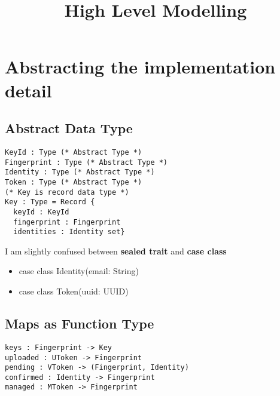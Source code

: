 \documentclass{article}
\begin{document}
\title{High Level Modelling}
\maketitle


\section{Abstracting the implementation detail}

\subsection{Abstract Data Type}
\begin{verbatim}
KeyId : Type (* Abstract Type *)
Fingerprint : Type (* Abstract Type *)
Identity : Type (* Abstract Type *)
Token : Type (* Abstract Type *)
(* Key is record data type *)
Key : Type = Record {
  keyId : KeyId
  fingerprint : Fingerprint
  identities : Identity set} 

\end{verbatim}

I am slightly confused between \textbf{sealed trait} and
\textbf{case class}
\begin{itemize}
\item case class Identity(email: String)
\item case class Token(uuid: UUID)
\end{itemize}  


\subsection{Maps as Function Type}
\begin{verbatim}
keys : Fingerprint -> Key
uploaded : UToken -> Fingerprint
pending : VToken -> (Fingerprint, Identity)
confirmed : Identity -> Fingerprint
managed : MToken -> Fingerprint
\end{verbatim}
\end{document}
